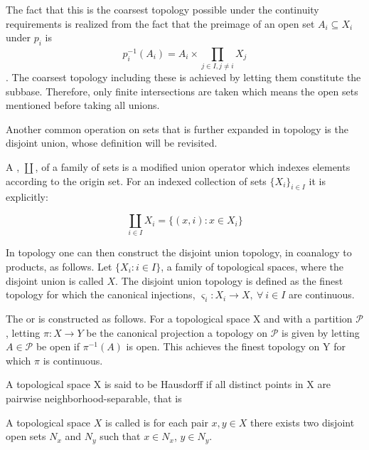 \documentclass[../../main.tex]{subfiles}
\begin{document}
    The fact that this is the coarsest topology possible under the continuity requirements is realized from the fact that the preimage of an open set $A_i \subseteq X_i$ under $p_i$ is \[p_i^{-1}(A_i) = A_i \times \prod_{j \in I, j \ne i}^{}X_j\]. The coarsest topology including these is achieved by letting them constitute the subbase. Therefore, only finite intersections are taken which means the open sets mentioned before taking all unions.
    
    Another common operation on sets that is further expanded in topology is the disjoint union, whose definition will be revisited. 

    \begin{definition}
        A , $\coprod$, of a family of sets is a modified union operator which indexes elements according to the origin set. For an indexed collection of sets $\{X_i\}_{i \in I}$ it is explicitly:

        \begin{equation*}
            \coprod_{i \in I} X_i = \{(x, i): x \in X_i\}
        \end{equation*}
    \end{definition}
    
    In topology one can then construct the disjoint union topology, in coanalogy to products, as follows. Let $\{X_i : i \in I\}$, a family of topological spaces, where the disjoint union is called $X$. The disjoint union topology is defined as the finest topology for which the canonical injections, $\varsigma_i :X_i\to X, \: \forall\: i \in I$ are continuous.
    
    The  or  is constructed as follows. For a topological space X and with a partition $\mathcal{P}$, letting $\pi:X \to Y$ be the canonical projection a topology on $\mathcal{P}$ is given by letting $A \in \mathcal{P}$ be open if $\pi^{-1}(A)$ is open. This achieves the finest topology on Y for which $\pi$ is continuous.
    
    A topological space X is said to be Hausdorff if all distinct points in X are pairwise neighborhood-separable, that is
    
    \begin{definition}
        A topological space $X$ is called  is for each pair $x, y \in X$ there exists two disjoint open sets $N_x$ and $N_y$ such that $x \in N_x$, $y \in N_y$.
    \end{definition}
    
\end{document}
